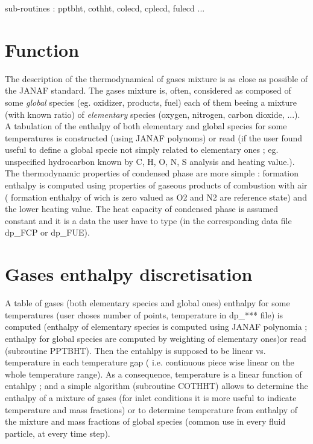 {\huge sub-routines : pptbht, cothht, colecd, cplecd, fulecd ...}

\section{Function}

The description of the thermodynamical of gases mixture is as close as possible
of the JANAF standard. The gases mixture is, often, considered as composed of
some {\em global} species ({\small eg. oxidizer, products, fuel}) each of them
beeing a mixture ({\small with known ratio}) of {\em elementary} species
({\small oxygen, nitrogen, carbon dioxide, ...}).\\ A tabulation of the enthalpy
of both elementary and global species for some temperatures is constructed
({\small using JANAF polynoms}) or read ({\small if the user found useful to
define a global specie not simply related to elementary ones ; eg. unspecified
hydrocarbon known by C, H, O, N, S analysis and heating value.}).\\ The
thermodynamic properties of condensed phase are more simple : formation enthalpy
is computed using properties of gaseous products of combustion with air ({\small
formation enthalpy of wich is zero valued as O2 and N2 are reference state}) and
the lower heating value. The heat capacity of condensed phase is assumed
constant and it is a data the user have to type ({\small in the corresponding
data file dp\_FCP or dp\_FUE}).


\section{Gases enthalpy discretisation}

A table of gases ({\small both elementary species and global ones}) enthalpy for
some temperatures ({\small user choses number of points, temperature in dp\_***
file}) is computed ({\small enthalpy of elementary species is computed using
JANAF polynomia ; enthalpy for global species are computed by weighting of
elementary ones})or read ({\small subroutine PPTBHT}). Then the entahlpy is
supposed to be linear vs. temperature in each temperature gap ({\small
i.e. continuous piece wise linear on the whole temperature range}). As a
consequence, temperature is a linear function of entahlpy ; and a simple
algorithm ({\small subroutine COTHHT}) allows to determine the enthalpy of a
mixture of gases ({\small for inlet conditions it is more useful to indicate
temperature and mass fractions}) or to determine temperature from enthalpy of
the mixture and mass fractions of global species ({\small common use in every
fluid particle, at every time step}).
